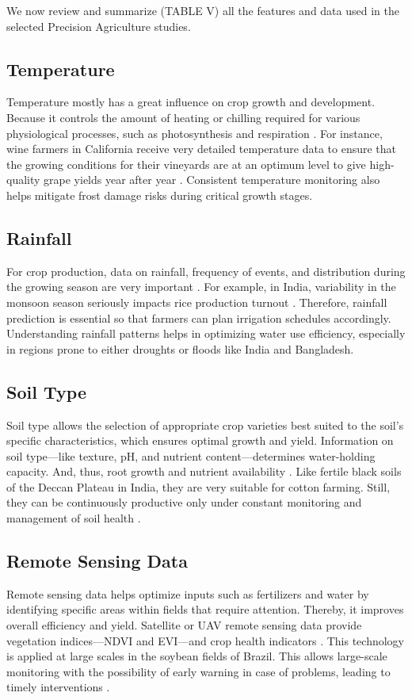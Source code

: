 \documentclass[conference]{IEEEtran}
\begin{document}
We now review and summarize (TABLE V) all the features and data used in the selected Precision Agriculture studies.

\subsection{Temperature}\label{AA}
Temperature mostly has a great influence on crop growth and development. Because it controls the amount of heating or chilling required for various physiological processes, such as photosynthesis and respiration \cite{b44}. For instance, wine farmers in California receive very detailed temperature data to ensure that the growing conditions for their vineyards are at an optimum level to give high-quality grape yields year after year \cite{b45}. Consistent temperature monitoring also helps mitigate frost damage risks during critical growth stages.

\subsection{Rainfall}\label{AA}
For crop production, data on rainfall, frequency of events, and distribution during the growing season are very important \cite{b46}. For example, in India, variability in the monsoon season seriously impacts rice production turnout \cite{b47}. Therefore, rainfall prediction is essential so that farmers can plan irrigation schedules accordingly. Understanding rainfall patterns helps in optimizing water use efficiency, especially in regions prone to either droughts or floods like India and Bangladesh.

\subsection{Soil Type}\label{AA}
Soil type allows the selection of appropriate crop varieties best suited to the soil’s specific characteristics, which ensures optimal growth and yield. Information on soil type—like texture, pH, and nutrient content—determines water-holding capacity. And, thus, root growth and nutrient availability \cite{b48}. Like fertile black soils of the Deccan Plateau in India, they are very suitable for cotton farming. Still, they can be continuously productive only under constant monitoring and management of soil health \cite{b49}.

\subsection{Remote Sensing Data}\label{AA}
Remote sensing data helps optimize inputs such as fertilizers and water by identifying specific areas within fields that require attention. Thereby, it improves overall efficiency and yield. Satellite or UAV remote sensing data provide vegetation indices—NDVI and EVI—and crop health indicators \cite{b50}. This technology is applied at large scales in the soybean fields of Brazil. This allows large-scale monitoring with the possibility of early warning in case of problems, leading to timely interventions \cite{b51}.
\end{document}
